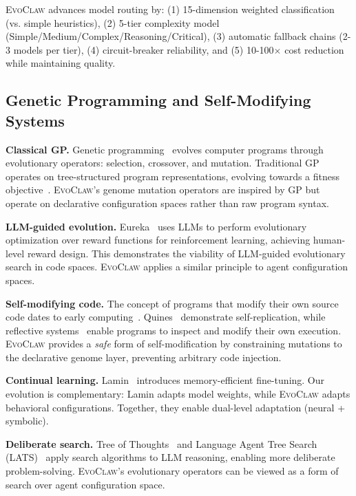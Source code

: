\documentclass{article}
\newcommand{\evoclaw}{\textsc{EvoClaw}}
\begin{document}
\evoclaw{} advances model routing by: (1) 15-dimension weighted classification (vs. simple heuristics), (2) 5-tier complexity model (Simple/Medium/Complex/Reasoning/Critical), (3) automatic fallback chains (2-3 models per tier), (4) circuit-breaker reliability, and (5) 10-100$\times$ cost reduction while maintaining quality.

\subsection{Genetic Programming and Self-Modifying Systems}

\textbf{Classical GP.} Genetic programming~\cite{koza1992gp} evolves computer programs through evolutionary operators: selection, crossover, and mutation. Traditional GP operates on tree-structured program representations, evolving towards a fitness objective~\cite{angeline1994genetic}. \evoclaw{}'s genome mutation operators are inspired by GP but operate on declarative configuration spaces rather than raw program syntax.

\textbf{LLM-guided evolution.} Eureka~\cite{ma2023eureka} uses LLMs to perform evolutionary optimization over reward functions for reinforcement learning, achieving human-level reward design. This demonstrates the viability of LLM-guided evolutionary search in code spaces. \evoclaw{} applies a similar principle to agent configuration spaces.

\textbf{Self-modifying code.} The concept of programs that modify their own source code dates to early computing~\cite{vonneumann1966self}. Quines~\cite{quine_thompson} demonstrate self-replication, while reflective systems~\cite{smith1984reflection} enable programs to inspect and modify their own execution. \evoclaw{} provides a \textit{safe} form of self-modification by constraining mutations to the declarative genome layer, preventing arbitrary code injection.

\textbf{Continual learning.} Lamin~\cite{lamar2023lamin} introduces memory-efficient fine-tuning. Our evolution is complementary: Lamin adapts model weights, while \evoclaw{} adapts behavioral configurations. Together, they enable dual-level adaptation (neural + symbolic).

\textbf{Deliberate search.} Tree of Thoughts~\cite{yao2023tree} and Language Agent Tree Search (LATS)~\cite{zhou2023lats} apply search algorithms to LLM reasoning, enabling more deliberate problem-solving. \evoclaw{}'s evolutionary operators can be viewed as a form of search over agent configuration space.
\end{document}
